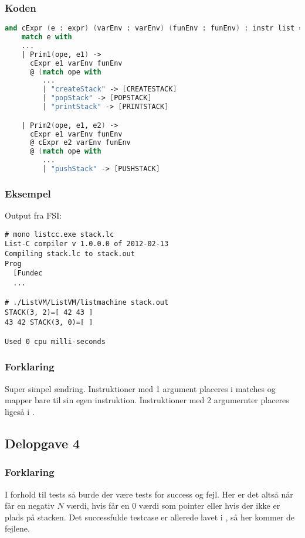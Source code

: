 \subsubsection{Koden}
\begin{lstlisting}[language=fsharp]
and cExpr (e : expr) (varEnv : varEnv) (funEnv : funEnv) : instr list = 
    match e with
    ...
    | Prim1(ope, e1) ->
      cExpr e1 varEnv funEnv
      @ (match ope with
         ...
         | "createStack" -> [CREATESTACK]
         | "popStack" -> [POPSTACK]
         | "printStack" -> [PRINTSTACK]

    | Prim2(ope, e1, e2) ->
      cExpr e1 varEnv funEnv
      @ cExpr e2 varEnv funEnv
      @ (match ope with
         ...
         | "pushStack" -> [PUSHSTACK]
\end{lstlisting}

\subsubsection{Eksempel}
Output fra FSI:
\begin{lstlisting}
# mono listcc.exe stack.lc
List-C compiler v 1.0.0.0 of 2012-02-13
Compiling stack.lc to stack.out
Prog
  [Fundec
  ...

# ./ListVM/ListVM/listmachine stack.out
STACK(3, 2)=[ 42 43 ]
43 42 STACK(3, 0)=[ ]

Used 0 cpu milli-seconds
\end{lstlisting}

\subsubsection{Forklaring}
Super simpel ændring. Instruktioner med 1 argument placeres i  matches og mapper bare til sin egen instruktion. Instruktioner med 2 argumernter placeres ligeså i .


\subsection{Delopgave 4}\label{ass:2-4}
\subsubsection{Forklaring}
I forhold til tests så burde der være tests for success og fejl. Her er det altså når  får en negativ $N$ værdi, hvis  får en 0 værdi som pointer eller hvis der ikke er plads på stacken. Det successfulde testcase er allerede lavet i , så her kommer de fejlene.

